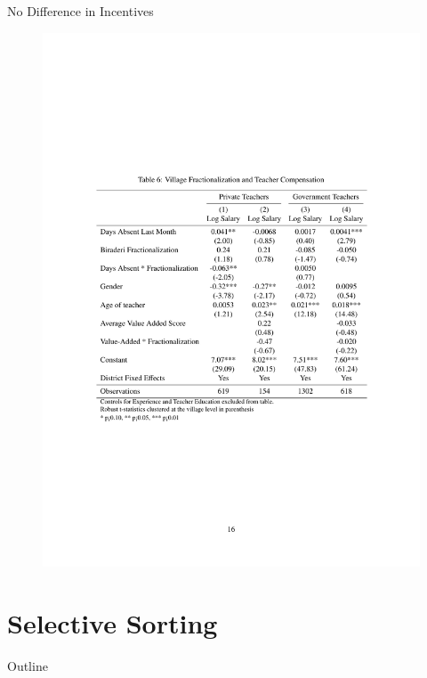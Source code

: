 \documentclass{beamer}
\begin{document}
\begin{frame}{No Difference in Incentives}
\begin{figure}[htb]
	\begin{center}
	\includegraphics[scale=0.7]{tables/frac_and_compensation.pdf}
	\end{center}
\end{figure}
\end{frame}

\section{Selective Sorting}\label{}
\begin{frame}{Outline}
	\tableofcontents[currentsection]
\end{frame}
\end{document}
